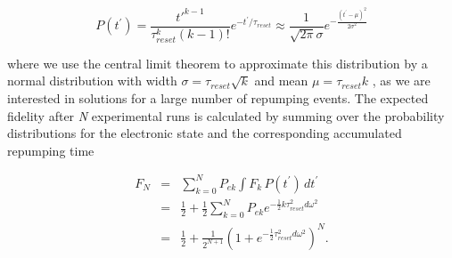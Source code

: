 \begin{equation}
P(t^{\prime}) = \frac{t'^{k-1}}{\tau_{reset}^k(k-1)! }e^{-t^{\prime}/\tau_{reset}} \approx \frac{1}{\sqrt{2\pi}\sigma}e^{-\frac{(t^{\prime}-\mu)^2}{2\sigma^2}}
\end{equation}


where we use the central limit theorem to approximate this distribution by a normal distribution with width $\sigma = \tau_{reset} \sqrt{k}$ and mean $\mu = \tau_{reset} k$ , as we are interested in solutions for a large number of repumping events. The expected fidelity after \textit{N} experimental runs is calculated by summing over the probability distributions for the electronic state and the corresponding accumulated repumping time

\begin{eqnarray}
F_N & = & \sum_{k=0}^N  P_{ek} \int F_k\, P(t^{\prime})\, dt^{\prime} \nonumber \\
& = & \frac{1}{2} + \frac{1}{2} \sum_{k=0}^N P_{ek} e^{-\frac{1}{2}k\tau_{reset}^2 d \omega^2} \nonumber \\
& = & \frac{1}{2} + \frac{1}{2^{N+1}}\left(1 + e^{-\frac{1}{2}\tau_{reset}^2 d \omega^2}\right)^N.
\end{eqnarray}

\newpage




